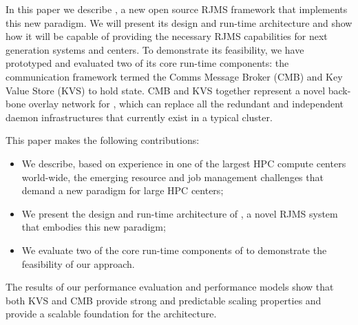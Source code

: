 In this paper we describe \flux, a new open source RJMS framework that implements
this new paradigm. We will present
its design and run-time architecture and show how it will be capable of providing
the necessary RJMS capabilities for next generation systems and centers. To
demonstrate its feasibility, we have prototyped and evaluated two of its core run-time components:
%
%
%
the communication framework termed the Comms Message Broker (CMB)
and Key Value Store (KVS) to hold \flux state.
%
%
CMB and KVS together represent a novel back-bone overlay network for \flux,
which can replace all the redundant and independent
daemon infrastructures that currently exist in a typical cluster.

This paper makes the following contributions:
\begin{itemize}
\item{We describe, based on experience in one of the largest HPC compute centers world-wide, the emerging resource and job management challenges that demand a new paradigm for large HPC centers;}
\item{We present the design and run-time architecture of \flux, a novel RJMS system that embodies this new paradigm;}
\item{We evaluate two of the core run-time components of \flux to demonstrate the feasibility of our approach.}
\end{itemize}

The results of our performance evaluation 
and performance models show that both KVS and CMB provide 
strong and predictable scaling properties and provide a scalable foundation 
for the \flux architecture.

